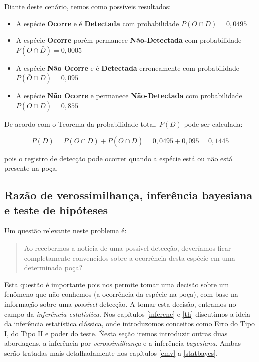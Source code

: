 \documentclass[
]{book}
\begin{document}
Diante deste cenário, temos como possíveis resultados:

\begin{itemize}
\item
  A espécie \textbf{Ocorre} e é \textbf{Detectada } com probabilidade \(P(O \cap D) = 0,0495\)
\item
  A espécie \textbf{Ocorre } porém permanece \textbf{Não-Detectada } com probabilidade \(P(O \cap \bar{D}) = 0,0005\)
\item
  A espécie \textbf{Não Ocorre } e é \textbf{Detectada } erroneamente com probabilidade \(P(\bar{O} \cap D) = 0,095\)
\item
  A espécie \textbf{Não Ocorre } e permanece \textbf{Não-Detectada } com probabilidade \(P(\bar{O} \cap\overline{D}) = 0,855\)
\end{itemize}

De acordo com o Teorema da probabilidade total, \(P(D)\) pode ser calculada:

\[P(D) = P(O \cap D) + P(\bar{O} \cap D) = 0,0495 + 0,095 = 0,1445\]

pois o registro de detecção pode ocorrer quando a espécie está ou não está presente na poça.

\hypertarget{razuxe3o-de-verossimilhanuxe7a-inferuxeancia-bayesiana-e-teste-de-hipuxf3teses}{%
\subsection{Razão de verossimilhança, inferência bayesiana e teste de hipóteses}\label{razuxe3o-de-verossimilhanuxe7a-inferuxeancia-bayesiana-e-teste-de-hipuxf3teses}}

Um questão relevante neste problema é:

\begin{quote}
Ao recebermos a notícia de uma possível detecção, deveríamos ficar completamente convencidos sobre a ocorrência desta espécie em uma determinada poça?
\end{quote}

Esta questão é importante pois nos permite tomar uma decisão sobre um fenômeno que não conhemos (a ocorrência da espécie na poça), com base na informação sobre uma \emph{possível} detecção. A tomar esta decisão, entramos no campo da \emph{inferência estatística}. Nos capítulos \ref{inferenc} e \ref{th} discutimos a ideia da inferência estatística clássica, onde introduzomos conceitos como Erro do Tipo I, do Tipo II e poder do teste. Ńesta seção iremos introduzir outras duas abordagens, a inferência por \emph{verossimilhança} e a inferência \emph{bayesiana}. Ambas serão tratadas mais detalhadamente nos capítulos \ref{emv} a \ref{statbayes}.
\end{document}
